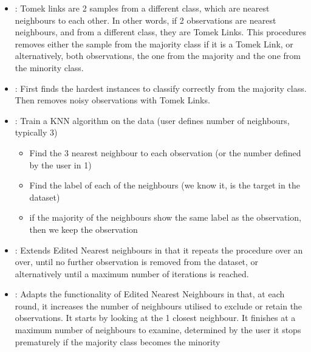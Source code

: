\documentclass[letterpaper,10pt,english]{jupyterBook}
\begin{document}
\begin{itemize}
\item {} 
\sphinxAtStartPar
{}: Tomek links are 2 samples from a different class, which are nearest neighbours to each other. In other words, if 2 observations are nearest neighbours, and from a different class, they are Tomek Links. This procedures removes either the sample from the majority class if it is a Tomek Link, or alternatively, both observations, the one from the majority and the one from the minority class.

\item {} 
\sphinxAtStartPar
{}: First finds the hardest instances to classify correctly from the majority class. Then removes noisy observations with Tomek Links.

\item {} 
\sphinxAtStartPar
{}: Train a KNN algorithm on the data (user defines number of neighbours, typically 3)
\begin{itemize}
\item {} 
\sphinxAtStartPar
Find the 3 nearest neighbour to each observation (or the number defined by the user in 1)

\item {} 
\sphinxAtStartPar
Find the label of each of the neighbours (we know it, is the target in the dataset)

\item {} 
\sphinxAtStartPar
if the majority of the neighbours show the same label as the observation, then we keep the observation

\end{itemize}

\item {} 
\sphinxAtStartPar
{}: Extends Edited Nearest neighbours in that it repeats the procedure over an over, until no further observation is removed from the dataset, or alternatively until a maximum number of iterations is reached.

\item {} 
\sphinxAtStartPar
{}: Adapts the functionality of Edited Nearest Neighbours in that, at each round, it increases the number of neighbours utilised to exclude or retain the observations.
It starts by looking at the 1 closest neighbour.
It finishes at a maximum number of neighbours to examine, determined by the user
it stops prematurely if the majority class becomes the minority


\end{itemize}
\end{document}
